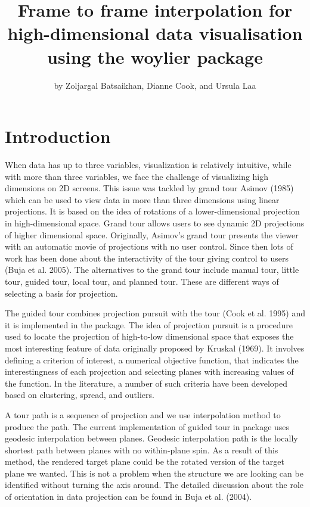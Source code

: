 \title{Frame to frame interpolation for high-dimensional data visualisation using the woylier package}


\author{by Zoljargal Batsaikhan, Dianne Cook, and Ursula Laa}

\maketitle


\hypertarget{introduction}{%
\section{Introduction}\label{introduction}}

When data has up to three variables, visualization is relatively intuitive, while with more than three variables, we face the challenge of visualizing high dimensions on 2D screens. This issue was tackled by grand tour Asimov (1985) which can be used to view data in more than three dimensions using linear projections. It is based on the idea of rotations of a lower-dimensional projection in high-dimensional space. Grand tour allows users to see dynamic 2D projections of higher dimensional space. Originally, Asimov's grand tour presents the viewer with an automatic movie of projections with no user control. Since then lots of work has been done about the interactivity of the tour giving control to users (Buja et al. 2005). The alternatives to the grand tour include manual tour, little tour, guided tour, local tour, and planned tour. These are different ways of selecting a basis for projection.

The guided tour combines projection pursuit with the tour (Cook et al. 1995) and it is implemented in the  package. The idea of projection pursuit is a procedure used to locate the projection of high-to-low dimensional space that exposes the most interesting feature of data originally proposed by Kruskal (1969). It involves defining a criterion of interest, a numerical objective function, that indicates the interestingness of each projection and selecting planes with increasing values of the function. In the literature, a number of such criteria have been developed based on clustering, spread, and outliers.

A tour path is a sequence of projection and we use interpolation method to produce the path. The current implementation of guided tour in  package uses geodesic interpolation between planes. Geodesic interpolation path is the locally shortest path between planes with no within-plane spin. As a result of this method, the rendered target plane could be the rotated version of the target plane we wanted. This is not a problem when the structure we are looking can be identified without turning the axis around. The detailed discussion about the role of orientation in data projection can be found in Buja et al. (2004).

